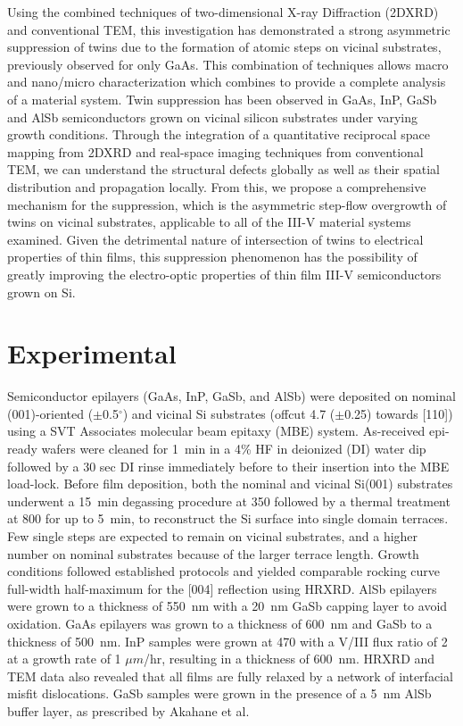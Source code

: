 Using the combined techniques of two-dimensional X-ray Diffraction (2DXRD) and conventional TEM, this investigation has demonstrated a strong asymmetric suppression of twins due to the formation of atomic steps on vicinal substrates, previously observed for only GaAs\cite{Wei1994,Xie1990,Rajkumar1990}.
This combination of techniques allows macro and nano/micro characterization which combines to provide a complete analysis of a material system.
Twin suppression has been observed in GaAs, InP, GaSb and AlSb semiconductors grown on vicinal silicon substrates under varying growth conditions.
Through the integration of a quantitative reciprocal space mapping from 2DXRD and real-space imaging techniques from conventional TEM, we can understand the structural defects globally as well as their spatial distribution and propagation locally.
From this, we propose a comprehensive mechanism for the suppression, which is the asymmetric step-flow overgrowth of twins on vicinal substrates, applicable to all of the III-V material systems examined.
Given the detrimental nature of intersection of twins to electrical properties of thin films, this suppression phenomenon has the possibility of greatly improving the electro-optic properties of thin film III-V semiconductors grown on Si.
\section{Experimental}
Semiconductor epilayers (GaAs, InP, GaSb, and AlSb) were deposited on nominal (001)-oriented (\(\pm\)0.5\(^\circ\)) and vicinal Si substrates (offcut 4.7\degree{} (\(\pm\)0.25\degree) towards [110]) using a SVT Associates molecular beam epitaxy (MBE) system.
As-received epi-ready wafers were cleaned for 1~min in a 4\% HF in deionized (DI) water dip followed by a 30 sec DI rinse immediately before to their insertion into the MBE load-lock.
Before film deposition, both the nominal and vicinal Si(001) substrates underwent a 15~min degassing procedure at 350\celsius{} followed by a thermal treatment at 800\celsius{} for up to 5~min, to reconstruct the Si surface into single domain terraces\cite{NeergaardWaltenburg1995,S1991,Sakamoto1986,Pehlke1991}.
Few single steps are expected to remain on vicinal substrates, and a higher number on nominal substrates because of the larger terrace length.
Growth conditions followed established protocols\cite{Akahane2004,Balakrishnan2006a,Fischer1986} and yielded comparable rocking curve full-width half-maximum for the [004] reflection using HRXRD\@.
AlSb epilayers were grown to a thickness of 550~nm with a 20~nm GaSb capping layer to avoid oxidation.
GaAs epilayers was grown to a thickness of 600~nm and GaSb to a thickness of 500~nm.
InP samples were grown at 470\celsius{} with a V/III flux ratio of 2 at a growth rate of 1 \(\mu m\)/hr, resulting in a thickness of 600~nm.
HRXRD and TEM data also revealed that all films are fully relaxed by a network of interfacial misfit dislocations\cite{Vajargah2011}.
GaSb samples were grown in the presence of a 5~nm AlSb buffer layer, as prescribed by Akahane et al.\cite{Akahane2004}

